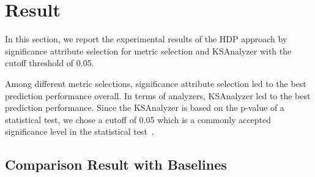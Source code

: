 \vspace{-0.5em}
\section{Result}
\label{sec:Result}
In this section, we report the experimental results of the HDP approach by
significance attribute selection for metric selection and KSAnalyzer with the cutoff threshold of 0.05.

Among different
metric selections, significance attribute selection led to the best
prediction performance overall. In terms of analyzers, KSAnalyzer led
to the best prediction performance.
Since the KSAnalyzer is based on the p-value of a statistical test, we chose
a cutoff of 0.05 which is a commonly accepted significance level in the
statistical test~\cite{Corder09}.

\vspace{-0.2em}
\subsection{Comparison Result with Baselines} %

